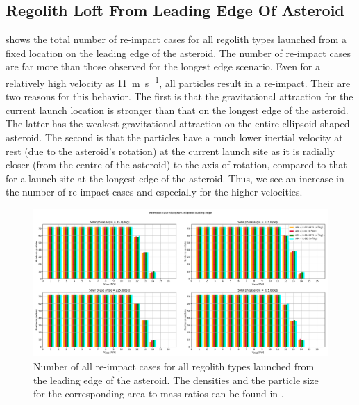 \subsection{Regolith Loft From Leading Edge Of Asteroid}
\label{sec:general_char_leadingEdge}
 shows the total number of re-impact cases for all regolith types launched from a fixed location on the leading edge of the asteroid. The number of re-impact cases are far more than those observed for the longest edge scenario. Even for a relatively high velocity as \SI{11}{\metre\per\second}, all particles result in a re-impact. Their are two reasons for this behavior. The first is that the gravitational attraction for the current launch location is stronger than that on the longest edge of the asteroid. The latter has the weakest gravitational attraction on the entire ellipsoid shaped asteroid. The second is that the particles have a much lower inertial velocity at rest (due to the asteroid's rotation) at the current launch site as it is radially closer (from the centre of the asteroid) to the axis of rotation, compared to that for a launch site at the longest edge of the asteroid. Thus, we see an increase in the number of re-impact cases and especially for the higher velocities.
\begin{figure}[htb]
\centering
\captionsetup{justification=centering}
\includegraphics[angle=90, width=\textwidth, height=\textheight, keepaspectratio=true]{leading_edge_perturbations/allReimpactCases.pdf}
\caption{Number of all re-impact cases for all regolith types launched from the leading edge of the asteroid. The densities and the particle size for the corresponding area-to-mass ratios can be found in .}
\label{fig:leadingEdge_allParticles_reimpact_hist}
\end{figure}
\FloatBarrier
